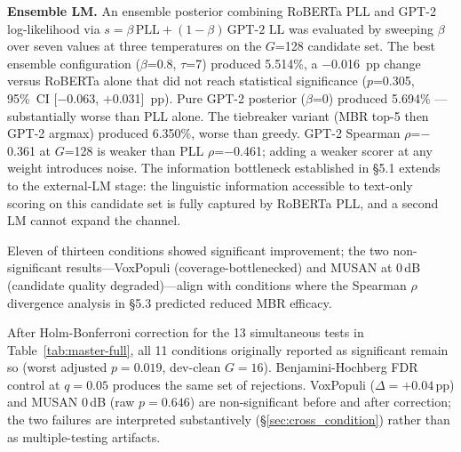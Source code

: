 \textbf{Ensemble LM.} An ensemble posterior combining RoBERTa PLL and GPT-2 log-likelihood via $s = \beta\,\text{PLL} + (1-\beta)\,\text{GPT-2 LL}$ was evaluated by sweeping $\beta$ over seven
values at three temperatures on the $G$=128 candidate set. The best ensemble
configuration ($\beta$=0.8, $\tau$=7) produced 5.514\%, a $-$0.016~pp change versus RoBERTa
alone that did not reach statistical significance ($p$=0.305, 95\%\ CI [$-$0.063,
$+$0.031]~pp). Pure GPT-2 posterior ($\beta$=0) produced 5.694\% — substantially worse than PLL
alone. The tiebreaker variant (MBR top-5 then GPT-2 argmax) produced 6.350\%, worse than greedy.
GPT-2 Spearman $\rho$=$-$0.361 at $G$=128 is weaker than PLL $\rho$=$-$0.461; adding a
weaker scorer at any weight introduces noise. The information bottleneck established in §5.1
extends to the external-LM stage: the linguistic information accessible to text-only scoring on
this candidate set is fully captured by RoBERTa PLL, and a second LM cannot expand the channel.



Eleven of thirteen conditions showed significant improvement; the two non-significant results---VoxPopuli (coverage-bottlenecked) and MUSAN at 0\,dB (candidate quality degraded)---align with conditions where the Spearman $\rho$ divergence analysis in §5.3 predicted reduced MBR efficacy.

After Holm-Bonferroni correction for the 13 simultaneous tests in
Table~\ref{tab:master-full}, all 11 conditions originally reported
as significant remain so (worst adjusted $p = 0.019$, dev-clean $G=16$).
Benjamini-Hochberg FDR control at $q=0.05$ produces the same set of
rejections. VoxPopuli ($\Delta = +0.04$\,pp) and MUSAN 0\,dB (raw $p = 0.646$) are non-significant before
and after correction; the two failures are interpreted substantively
(\S\ref{sec:cross_condition}) rather than as multiple-testing artifacts.
